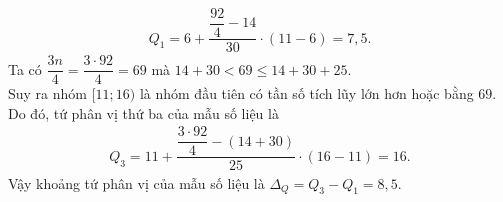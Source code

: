 \begin{bt}
{\begin{align*}
Q_1=6+\dfrac{\dfrac{92}{4}-14}{30}\cdot(11-6)=7{,}5.
\end{align*}
Ta có $\dfrac{3n}{4}=\dfrac{3\cdot 92}{4}=69$ mà $14+30<69\le 14+30+25$. \\ Suy ra nhóm $[11;16)$ là nhóm đầu tiên có tần số tích lũy lớn hơn hoặc bằng $69$.\\ Do đó, tứ phân vị thứ ba của mẫu số liệu là 
\begin{align*}
Q_3=11+\dfrac{\dfrac{3 \cdot 92}{4}-(14+30)}{25}\cdot(16-11)=16.
\end{align*}
Vậy khoảng tứ phân vị của mẫu số liệu là $\Delta_Q=Q_3-Q_1=8{,}5$.}
\end{bt}

\begin{bt}%


\end{bt}
